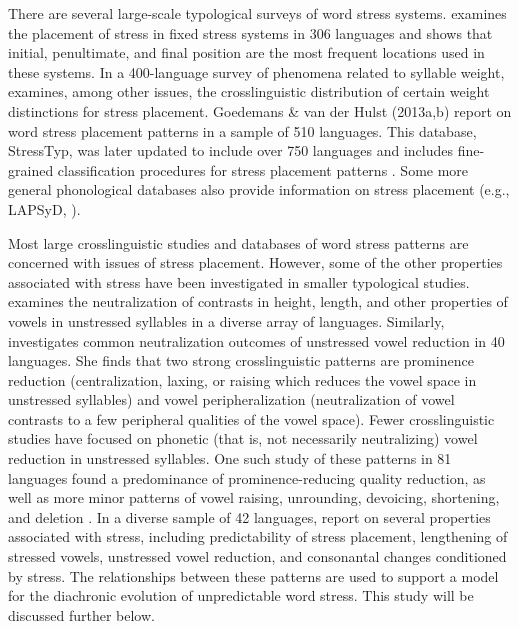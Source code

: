   There are several large-scale typological surveys of word stress systems. \citet{Hyman1977} examines the placement of stress in fixed stress systems in 306 languages and shows that initial, penultimate, and final position are the most frequent locations used in these systems. In a 400-language survey of phenomena related to syllable weight, \citet{Gordon2006} examines, among other issues, the crosslinguistic distribution of certain weight distinctions for stress placement. Goedemans \& van der Hulst (2013a,b) report on word stress placement patterns in a sample of 510 languages. This database, StressTyp, was later updated to include over 750 languages and includes fine-grained classification procedures for stress placement patterns \citep{GoedemansEtAl2017}. Some more general phonological databases also provide information on stress placement (e.g., LAPSyD, \citealt{MaddiesonEtAl2013}).

  Most large crosslinguistic studies and databases of word stress patterns are concerned with issues of stress placement. However, some of the other properties associated with stress have been investigated in smaller typological studies. \citet{Barnes2002} examines the neutralization of contrasts in height, length, and other properties of vowels in unstressed syllables in a diverse array of languages. Similarly, \citet{Crosswhite2001} investigates common neutralization outcomes of unstressed vowel reduction in 40 languages. She finds that two strong crosslinguistic patterns are prominence reduction (centralization, laxing, or raising which reduces the vowel space in unstressed syllables) and vowel peripheralization (neutralization of vowel contrasts to a few peripheral qualities of the vowel space). Fewer crosslinguistic studies have focused on phonetic (that is, not necessarily neutralizing) vowel reduction in unstressed syllables. One such study of these patterns in 81 languages found a predominance of prominence-reducing quality reduction, as well as more minor patterns of vowel raising, unrounding, devoicing, shortening, and deletion \citep{KapatsinskiEtAl2019}. In a diverse sample of 42 languages, \citet{BybeeEtAl1998} report on several properties associated with stress, including predictability of stress placement, lengthening of stressed vowels, unstressed vowel reduction, and consonantal changes conditioned by stress. The relationships between these patterns are used to support a model for the diachronic evolution of unpredictable word stress. This study will be discussed further below.

